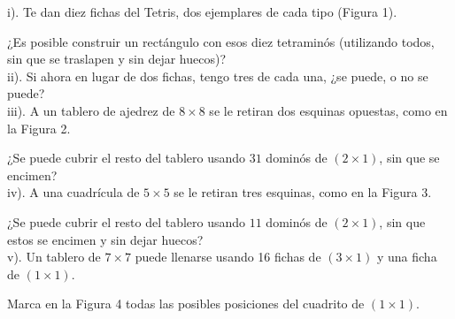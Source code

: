\begin{multicols}{2}
i). Te dan diez fichas del Tetris, dos ejemplares de cada tipo (Figura 1).

¿Es posible construir un rectángulo con esos diez tetraminós (utilizando todos, sin que se traslapen y sin dejar huecos)?\\


ii). Si ahora en lugar de dos fichas, tengo tres de cada una, ¿se puede, o no se puede?\\


iii). A un tablero de ajedrez de $8\times 8$ se le retiran dos esquinas opuestas, como en la Figura 2. 

¿Se puede cubrir el resto del tablero usando $31$ dominós de $(2\times 1)$, sin que se encimen?\\


iv). A una cuadrícula de $5\times 5$ se le retiran tres esquinas, como en la Figura 3.
  
¿Se puede cubrir el resto del tablero usando $11$ dominós de $(2\times 1)$, sin que estos se encimen y sin dejar huecos?\\


v). Un tablero de $7\times 7$ puede llenarse usando 16 fichas de $(3\times 1)$ y una ficha de $(1\times 1)$.

Marca en la Figura 4 todas las posibles posiciones del cuadrito de $(1\times 1)$.


\columnbreak


\end{multicols}
